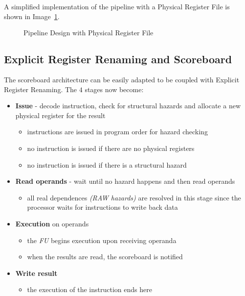 \documentclass[english]{article}
\begin{document}
A simplified implementation of the pipeline with a Physical Register File is shown in Image~\ref{fig:pipeline-design-with-physical-register-file}.

\begin{figure}[htbp]
  \bigskip
  \centering
  \caption{Pipeline Design with Physical Register File}
  \label{fig:pipeline-design-with-physical-register-file}
  \bigskip
\end{figure}

\subsection{Explicit Register Renaming and Scoreboard}

The scoreboard architecture can be easily adapted to be coupled with Explicit Register Renaming.
The \(4\) stages now become:

\begin{itemize}
  \item \textbf{Issue} - decode instruction, check for structural hazards and allocate a new physical register for the result
        \begin{itemize}
          \item instructions are issued in program order for hazard checking
          \item no instruction is issued if there are no physical registers
          \item no instruction is issued if there is a structural hazard
        \end{itemize}
  \item \textbf{Read operands} - wait until no hazard happens and then read operands
        \begin{itemize}
          \item all real dependences \textit{(RAW hazards)}  are resolved in this stage since the processor waits for instructions to write back data
        \end{itemize}
  \item \textbf{Execution} on operands
        \begin{itemize}
          \item the \textit{FU} begins execution upon receiving operanda
          \item when the results are read, the scoreboard is notified
        \end{itemize}
  \item \textbf{Write result}
        \begin{itemize}
          \item the execution of the instruction ends here
        \end{itemize}
\end{itemize}
\end{document}
